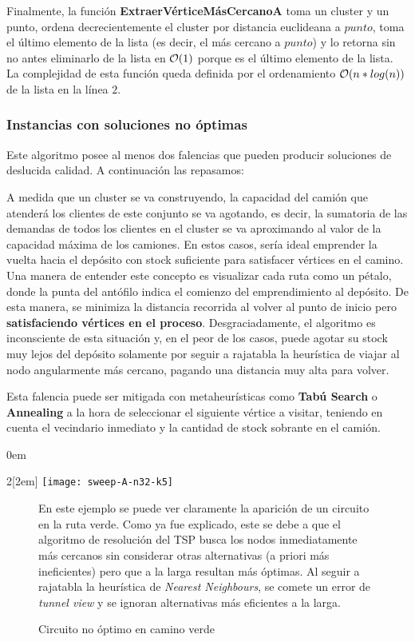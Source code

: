 
Finalmente, la función \textbf{ExtraerVérticeMásCercanoA} toma un cluster y un punto, ordena decrecientemente el cluster por distancia euclideana a $punto$, toma el último elemento de la lista (es decir, el más cercano a $punto$) y lo retorna sin no antes eliminarlo de la lista en $\mathcal{O}(1)$ porque es el último elemento de la lista. La complejidad de esta función queda definida por el ordenamiento $\mathcal{O}(n*log(n))$ de la lista en la línea $2$.

\subsubsection{Instancias con soluciones no óptimas}
Este algoritmo posee al menos dos falencias que pueden producir soluciones de deslucida calidad. A continuación las repasamos:

A medida que un cluster se va construyendo, la capacidad del camión que atenderá los clientes de este conjunto se va agotando, es decir, la sumatoria de las demandas de todos los clientes en el cluster se va aproximando al valor de la capacidad máxima de los camiones. En estos casos, sería ideal emprender la vuelta hacia el depósito con stock suficiente para satisfacer vértices en el camino. Una manera de entender este concepto es visualizar cada ruta como un pétalo, donde la punta del antófilo indica el comienzo del emprendimiento al depósito. De esta manera, se minimiza la distancia recorrida al volver al punto de inicio pero \textbf{satisfaciendo vértices en el proceso}. Desgraciadamente, el algoritmo es inconsciente de esta situación y, en el peor de los casos, puede agotar su stock muy lejos del depósito solamente por seguir a rajatabla la heurística de viajar al nodo angularmente más cercano, pagando una distancia muy alta para volver.

\vskip 8pt

Esta falencia puede ser mitigada con metaheurísticas como \textbf{Tabú Search} o \textbf{Annealing} a la hora de seleccionar el siguiente vértice a visitar, teniendo en cuenta el vecindario inmediato y la cantidad de stock sobrante en el camión.

\parindent0em
\begin{multicols}{2}[\columnsep2em]
		\texttt{[image: sweep-A-n32-k5]}
\columnbreak

	\begin{figure}[H]
		\caption{Circuito no óptimo en camino verde} \label{fig:sweep-A-n32-k5}
		\vskip 4pt
		En este ejemplo se puede ver claramente la aparición de un circuito en la ruta verde. Como ya fue explicado, este se debe a que el algoritmo de resolución del TSP busca los nodos inmediatamente más cercanos sin considerar otras alternativas (a priori más ineficientes) pero que a la larga resultan más óptimas. Al seguir a rajatabla la heurística de \textit{Nearest Neighbours}, se comete un error de \textit{tunnel view} y se ignoran alternativas más eficientes a la larga.
	\end{figure}
\end{multicols}

